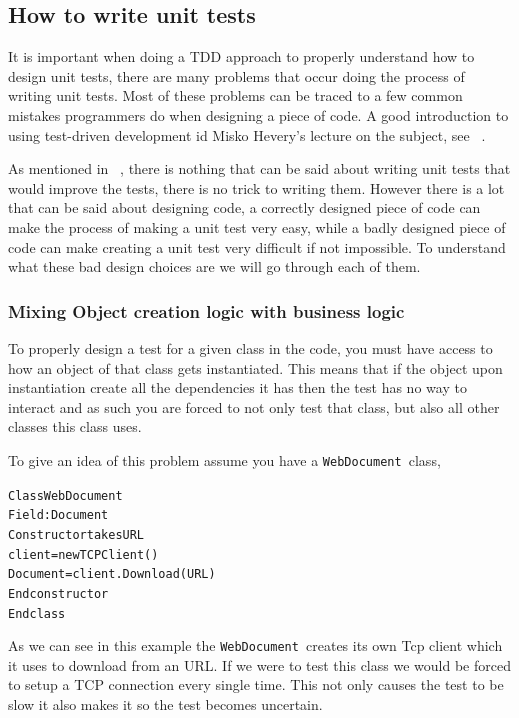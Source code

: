 \subsection{How to write unit tests}

It is important when doing a TDD approach to properly understand how
to design unit tests, there are many problems that occur doing the
process of writing unit tests. Most of these problems can be traced
to a few common mistakes programmers do when designing a piece of
code. A good introduction to using test-driven development id Misko
Hevery's lecture on the subject, see ~\cite{LectureTDD}.

As mentioned in ~\cite{LectureTDD}, there is nothing that can be
said about writing unit tests that would improve the tests, there
is no trick to writing them. However there is a lot that can be said
about designing code, a correctly designed piece of code can make
the process of making a unit test very easy, while a badly designed
piece of code can make creating a unit test very difficult if not
impossible. To understand what these bad design choices are we will
go through each of them. 


\subsubsection*{Mixing Object creation logic with business logic}

To properly design a test for a given class in the code, you must
have access to how an object of that class gets instantiated. This
means that if the object upon instantiation create all the dependencies
it has then the test has no way to interact and as such you are forced
to not only test that class, but also all other classes this class
uses.

To give an idea of this problem assume you have a \texttt{WebDocument
}class, 

\begin{alltt}
Class WebDocument 	
    Field: Document 	
    Constructor takes URL 		
        client = new TCPClient() 		
        Document = client.Download(URL)
    Endconstructor 
Endclass
\end{alltt}

As we can see in this example the \texttt{WebDocument }creates its
own Tcp client which it uses to download from an URL. If we were to
test this class we would be forced to setup a TCP connection every
single time. This not only causes the test to be slow it also makes
it so the test becomes uncertain.

